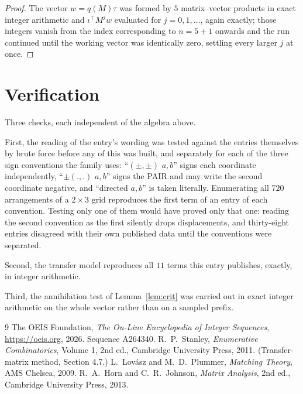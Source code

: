 \documentclass[11pt,a4paper]{article}
\theoremstyle{plain}
\theoremstyle{definition}
\begin{document}
\begin{proof}
The vector $w=q(M)\tau$ was formed by $5$ matrix--vector products in exact integer
arithmetic and $\iota^{\!\top}M^{j}w$ evaluated for $j=0,1,\dots$, again exactly; those
integers vanish from the index corresponding to $n=5+1$ onwards and the run continued
until the working vector was identically zero, settling every larger $j$ at once.
\end{proof}

\section{Verification}

Three checks, each independent of the algebra above.

First, the reading of the entry's wording was tested against the entries themselves by brute
force before any of this was built, and separately for each of the three sign conventions the
family uses: ``$(\pm,\pm)$ $a,b$'' signs each coordinate independently, ``$\pm(.,.)$ $a,b$''
signs the PAIR and may write the second coordinate negative, and ``directed $a,b$'' is taken
literally. Enumerating all $720$ arrangements of a $2\times3$ grid reproduces the first term
of an entry of each convention. Testing only one of them would have proved only that one:
reading the second convention as the first silently drops displacements, and thirty-eight
entries disagreed with their own published data until the conventions were separated.

Second, the transfer model reproduces all $11$ terms this entry publishes, exactly, in
integer arithmetic.

Third, the annihilation test of Lemma~\ref{lem:crit} was carried out in exact integer
arithmetic on the whole vector rather than on a sampled prefix.

\begin{thebibliography}{9}
 The OEIS Foundation, \emph{The On-Line Encyclopedia of Integer
Sequences}, \url{https://oeis.org}, 2026. Sequence A264340.
 R.~P.~Stanley, \emph{Enumerative Combinatorics}, Volume 1, 2nd ed.,
Cambridge University Press, 2011. (Transfer-matrix method, Section 4.7.)
 L.~Lov\'asz and M.~D.~Plummer, \emph{Matching Theory}, AMS Chelsea, 2009.
 R.~A.~Horn and C.~R.~Johnson, \emph{Matrix Analysis}, 2nd ed., Cambridge
University Press, 2013.
\end{thebibliography}
\end{document}

